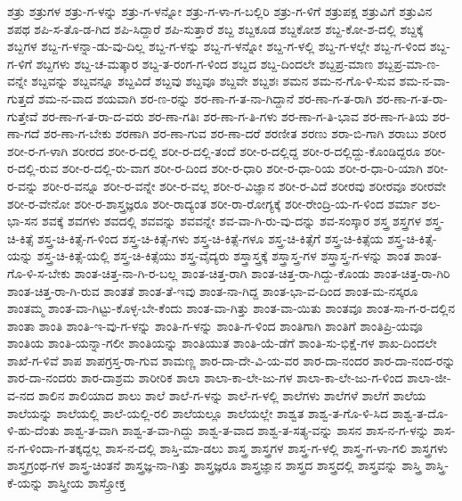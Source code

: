 {ಶತ್ರು
ಶತ್ರುಗಳ
ಶತ್ರು-ಗ-ಳನ್ನು
ಶತ್ರು-ಗ-ಳನ್ನೋ
ಶತ್ರು-ಗ-ಳಾ-ಗ-ಬಲ್ಲಿರಿ
ಶತ್ರು-ಗ-ಳಿಗೆ
ಶತ್ರುಪಕ್ಷ
ಶತ್ರುವಿಗೆ
ಶತ್ರುವಿನ
ಶಪಥ
ಶಪಿ-ಸ-ತೊ-ಡ-ಗಿದ
ಶಪಿ-ಸಿದ್ದಾರೆ
ಶಪಿ-ಸುತ್ತಾರೆ
ಶಬ್ದ
ಶಬ್ದಕೂಡ
ಶಬ್ದಕೋಶ
ಶಬ್ದ-ಕೋ-ಶ-ದಲ್ಲಿ
ಶಬ್ದಕ್ಕೆ
ಶಬ್ದಗಳ
ಶಬ್ದ-ಗ-ಳನ್ನಾ-ಡು-ವು-ದಿಲ್ಲ
ಶಬ್ದ-ಗ-ಳನ್ನು
ಶಬ್ದ-ಗ-ಳನ್ನೋ
ಶಬ್ದ-ಗ-ಳಲ್ಲಿ
ಶಬ್ದ-ಗ-ಳಲ್ಲೇ
ಶಬ್ದ-ಗ-ಳಿಂದ
ಶಬ್ದ-ಗ-ಳಿಗೆ
ಶಬ್ದಗಳು
ಶಬ್ದ-ಚ-ಮತ್ಕಾರ
ಶಬ್ದ-ತ-ರಂಗ-ಗ-ಳಿಂದ
ಶಬ್ದದ
ಶಬ್ದ-ದಿಂದಲೇ
ಶಬ್ದಪ್ರ-ಮಾಣ
ಶಬ್ದಪ್ರ-ಮಾ-ಣ-ವನ್ನೇ
ಶಬ್ದವನ್ನು
ಶಬ್ದವನ್ನೂ
ಶಬ್ದವಿದೆ
ಶಬ್ದವು
ಶಬ್ದವೂ
ಶಬ್ದವೇ
ಶಬ್ದಶಃ
ಶಮನ
ಶಮ-ನ-ಗೊ-ಳಿ-ಸುವ
ಶಮ-ನ-ವಾ-ಗುತ್ತದೆ
ಶಮ-ನ-ವಾದ
ಶಯವಾಗಿ
ಶರ-ಣ-ರನ್ನು
ಶರ-ಣಾ-ಗ-ತ-ನಾ-ಗಿದ್ದಾನೆ
ಶರ-ಣಾ-ಗ-ತ-ರಾಗಿ
ಶರ-ಣಾ-ಗ-ತ-ರಾ-ಗುತ್ತೇವೆ
ಶರ-ಣಾ-ಗ-ತ-ರಾ-ದ-ವರು
ಶರ-ಣಾ-ಗತಿಃ
ಶರ-ಣಾ-ಗ-ತಿ-ಗಳು
ಶರ-ಣಾ-ಗ-ತಿ-ಭಾವ
ಶರ-ಣಾ-ಗ-ತಿಯ
ಶರ-ಣಾ-ಗದೆ
ಶರ-ಣಾ-ಗ-ಬೇಕು
ಶರಣಾಗಿ
ಶರ-ಣಾ-ಗುವ
ಶರ-ಣಾ-ದರೆ
ಶರಣೀತ
ಶರಣು
ಶರಾ-ಬಿ-ಗಾಗಿ
ಶರಾಬು
ಶರೀರ
ಶರೀ-ರ-ಗ-ಳಾಗಿ
ಶರೀರದ
ಶರೀ-ರ-ದಲ್ಲಿ
ಶರೀ-ರ-ದಲ್ಲಿ-ತಂದೆ
ಶರೀ-ರ-ದಲ್ಲಿದ್ದ
ಶರೀ-ರ-ದಲ್ಲಿದ್ದು-ಕೊಂಡಿದ್ದರೂ
ಶರೀ-ರ-ದಲ್ಲಿ-ರುವ
ಶರೀ-ರ-ದಲ್ಲಿ-ರು-ವಾಗ
ಶರೀ-ರ-ದಿಂದ
ಶರೀ-ರ-ಧಾರಿ
ಶರೀ-ರ-ಧಾ-ರಿಯ
ಶರೀ-ರ-ಧಾ-ರಿ-ಯಾಗಿ
ಶರೀ-ರ-ವನ್ನು
ಶರೀ-ರ-ವನ್ನೂ
ಶರೀ-ರ-ವನ್ನೇ
ಶರೀ-ರ-ವಲ್ಲ
ಶರೀ-ರ-ವಿಜ್ಞಾನ
ಶರೀ-ರ-ವಿದೆ
ಶರೀರವು
ಶರೀರವೂ
ಶರೀರವೇ
ಶರೀ-ರ-ವೇನೋ
ಶರೀ-ರ-ಶಾಸ್ತ್ರಜ್ಞರೂ
ಶರೀ-ರಾದ್ಯಂತ
ಶರೀ-ರಾ-ರೋಗ್ಯಕ್ಕೆ
ಶರೀ-ರೇಂದ್ರಿ-ಯ-ಗ-ಳಿಂದ
ಶರ್ಮಾ
ಶಲ-ಭಾ-ಸನ
ಶವಕ್ಕೆ
ಶವಗಳು
ಶವದಲ್ಲಿ
ಶವವನ್ನು
ಶವವನ್ನೇ
ಶವ-ವಾ-ಗಿ-ರು-ವು-ದನ್ನು
ಶವ-ಸಂಸ್ಕಾರ
ಶಸ್ತ್ರ
ಶಸ್ತ್ರಗಳ
ಶಸ್ತ್ರ-ಚಿ-ಕಿತ್ಸೆ
ಶಸ್ತ್ರ-ಚಿ-ಕಿತ್ಸೆ-ಗ-ಳಿಂದ
ಶಸ್ತ್ರ-ಚಿ-ಕಿತ್ಸೆ-ಗಳು
ಶಸ್ತ್ರ-ಚಿ-ಕಿತ್ಸೆ-ಗಳೂ
ಶಸ್ತ್ರ-ಚಿ-ಕಿತ್ಸೆಗೆ
ಶಸ್ತ್ರ-ಚಿ-ಕಿತ್ಸೆಯ
ಶಸ್ತ್ರ-ಚಿ-ಕಿತ್ಸೆ-ಯನ್ನು
ಶಸ್ತ್ರ-ಚಿ-ಕಿತ್ಸೆ-ಯಲ್ಲಿ
ಶಸ್ತ್ರ-ಚಿ-ಕಿತ್ಸೆಯು
ಶಸ್ತ್ರ-ವೈದ್ಯರು
ಶಸ್ತ್ರಾಸ್ತ್ರಕ್ಕೆ
ಶಸ್ತ್ರಾಸ್ತ್ರ-ಗಳ
ಶಸ್ತ್ರಾಸ್ತ್ರ-ಗ-ಳನ್ನು
ಶಾಂತ
ಶಾಂತ-ಗೊ-ಳಿ-ಸ-ಬೇಕು
ಶಾಂತ-ಚಿತ್ತ-ನಾ-ಗಿ-ರ-ಬಲ್ಲ
ಶಾಂತ-ಚಿತ್ತ-ರಾಗಿ
ಶಾಂತ-ಚಿತ್ತ-ರಾ-ಗಿದ್ದು-ಕೊಂಡು
ಶಾಂತ-ಚಿತ್ತ-ರಾ-ಗಿರಿ
ಶಾಂತ-ಚಿತ್ತ-ರಾ-ಗಿ-ರುವ
ಶಾಂತತೆ
ಶಾಂತ-ತೆ-ಇವು
ಶಾಂತ-ನಾ-ಗಿದ್ದ
ಶಾಂತ-ಭಾ-ವ-ದಿಂದ
ಶಾಂತ-ಮ-ನಸ್ಕರೂ
ಶಾಂತಮ್ಮ
ಶಾಂತ-ವಾ-ಗಿಟ್ಟು-ಕೊಳ್ಳ-ಬೇ-ಕೆಂದು
ಶಾಂತ-ವಾ-ಗಿತ್ತು
ಶಾಂತ-ವಾ-ಯಿತು
ಶಾಂತವೂ
ಶಾಂತ-ಸಾ-ಗ-ರ-ದಲ್ಲಿನ
ಶಾಂತಾ
ಶಾಂತಿ
ಶಾಂತಿ-ಇ-ವು-ಗ-ಳನ್ನು
ಶಾಂತಿ-ಗ-ಳನ್ನು
ಶಾಂತಿ-ಗ-ಳಿಂದ
ಶಾಂತಿಗಾಗಿ
ಶಾಂತಿಗೆ
ಶಾಂತಿಪ್ರಿ-ಯವೂ
ಶಾಂತಿಯ
ಶಾಂತಿ-ಯನ್ನಾ-ಗಲೀ
ಶಾಂತಿಯನ್ನು
ಶಾಂತಿಯುತ
ಶಾಂತಿ-ಯೆ-ಡೆಗೆ
ಶಾಂತಿ-ಸು-ಭಿಕ್ಷೆ-ಗಳ
ಶಾಖ-ದಿಂದಲೇ
ಶಾಖೆ-ಗ-ಳಿವೆ
ಶಾಪ
ಶಾಪಗ್ರಸ್ತ-ರಾ-ಗುವ
ಶಾಮಣ್ಣ
ಶಾರ-ದಾ-ದೇ-ವಿ-ಯ-ವರ
ಶಾರ-ದಾ-ನಂದರ
ಶಾರ-ದಾ-ನಂದ-ರನ್ನು
ಶಾರ-ದಾ-ನಂದರು
ಶಾರ-ದಾಶ್ರಮ
ಶಾರೀರಿಕ
ಶಾಲಾ
ಶಾಲಾ-ಕಾ-ಲೇ-ಜು-ಗಳ
ಶಾಲಾ-ಕಾ-ಲೇ-ಜು-ಗ-ಳಿಂದ
ಶಾಲಾ-ಜೀ-ವ-ನದ
ಶಾಲಿನ
ಶಾಲಿಯಾದ
ಶಾಲು
ಶಾಲೆ
ಶಾಲೆ-ಗ-ಳನ್ನು
ಶಾಲೆ-ಗ-ಳಲ್ಲಿ
ಶಾಲೆಗಳು
ಶಾಲೆಗಳೆ
ಶಾಲೆಗೆ
ಶಾಲೆಯ
ಶಾಲೆಯನ್ನು
ಶಾಲೆಯಲ್ಲಿ
ಶಾಲೆ-ಯಲ್ಲಿ-ರಲಿ
ಶಾಲೆಯಲ್ಲೂ
ಶಾಲೆಯಲ್ಲೇ
ಶಾಶ್ವತ
ಶಾಶ್ವ-ತ-ಗೊ-ಳಿ-ಸಿದ
ಶಾಶ್ವ-ತ-ದೊ-ಳಿ-ಹು-ದೆಂತು
ಶಾಶ್ವ-ತ-ವಾಗಿ
ಶಾಶ್ವ-ತ-ವಾ-ಗಿದ್ದು
ಶಾಶ್ವ-ತ-ವಾದ
ಶಾಶ್ವ-ತ-ಸತ್ಯ-ವನ್ನು
ಶಾಸನ
ಶಾಸ-ನ-ಗ-ಳನ್ನು
ಶಾಸ-ನ-ಗ-ಳಿಂದಾ-ಗ-ತಕ್ಕದ್ದಲ್ಲ
ಶಾಸ-ನ-ದಲ್ಲಿ
ಶಾಸ್ತಿ-ಮಾ-ಡಲು
ಶಾಸ್ತ್ರ
ಶಾಸ್ತ್ರಗಳ
ಶಾಸ್ತ್ರ-ಗ-ಳಲ್ಲಿ
ಶಾಸ್ತ್ರ-ಗ-ಳಾ-ಗಲಿ
ಶಾಸ್ತ್ರಗಳು
ಶಾಸ್ತ್ರಗ್ರಂಥ-ಗಳ
ಶಾಸ್ತ್ರ-ಚಿಂತನೆ
ಶಾಸ್ತ್ರಜ್ಞ-ನಾ-ಗಿತ್ತು
ಶಾಸ್ತ್ರಜ್ಞರೂ
ಶಾಸ್ತ್ರಜ್ಞಾನ
ಶಾಸ್ತ್ರದ
ಶಾಸ್ತ್ರದಲ್ಲಿ
ಶಾಸ್ತ್ರವನ್ನು
ಶಾಸ್ತ್ರಿ
ಶಾಸ್ತ್ರಿ-ಕೆ-ಯನ್ನು
ಶಾಸ್ತ್ರೀಯ
ಶಾಸ್ತ್ರೋಕ್ತ
}
